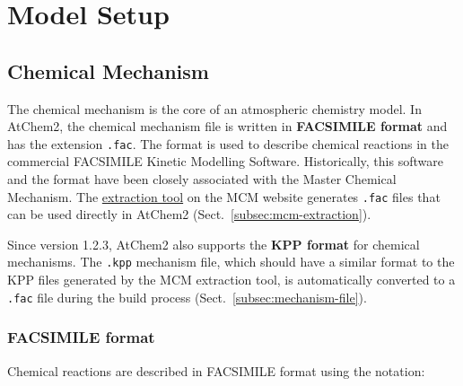 %
%
%
%

\chapter{Model Setup} \label{ch:setup}

\section{Chemical Mechanism} \label{sec:chemical-mechanism}

The chemical mechanism is the core of an atmospheric chemistry model. In AtChem2, the chemical
mechanism file is written in \textbf{FACSIMILE format} and has the extension \texttt{.fac}. The
format is used to describe chemical reactions in the commercial FACSIMILE Kinetic Modelling
Software. Historically, this software and the format have been closely associated with the
Master Chemical Mechanism. The \href{https://mcm.york.ac.uk/MCM/export}{extraction tool} on
the MCM website generates \texttt{.fac} files that can be used directly in AtChem2
(Sect.~\ref{subsec:mcm-extraction}).

Since version 1.2.3, AtChem2 also supports the \textbf{KPP format} for chemical mechanisms. The
\texttt{.kpp} mechanism file, which should have a similar format to the KPP files generated by
the MCM extraction tool, is automatically converted to a \texttt{.fac} file during the build
process (Sect.~\ref{subsec:mechanism-file}).

\subsection{FACSIMILE format} \label{subsec:facsimile-format}

Chemical reactions are described in FACSIMILE format using the notation:

\begin{Verbatim}[fontsize=\small]
  % k : A + B = C + D ;
\end{Verbatim}

